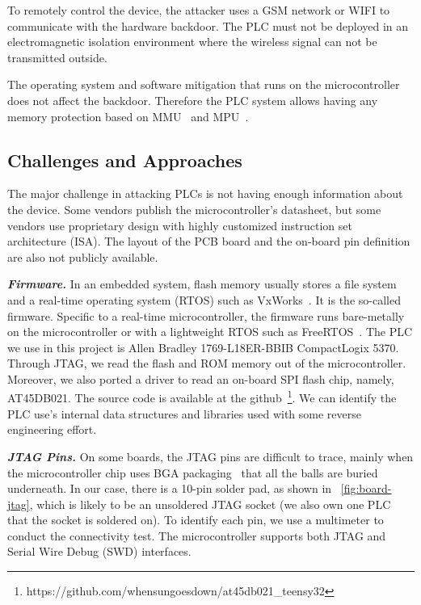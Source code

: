To remotely control the device, the attacker uses a GSM network or WIFI to communicate with the hardware backdoor. The PLC must not be deployed in an electromagnetic isolation environment where the wireless signal can not be transmitted outside.

The operating system and software mitigation that runs on the microcontroller does not affect the backdoor. Therefore the PLC system allows having any memory protection based on MMU~\cite{shalan2000dynamic} and MPU~\cite{kim2018securing}.


\subsection{Challenges and Approaches}

The major challenge in attacking PLCs is not having enough information about the device. Some vendors publish the microcontroller's datasheet, but some vendors use proprietary design with highly customized instruction set architecture (ISA).  The layout of the PCB board and the on-board pin definition are also not publicly available.


\textbf{\textit{Firmware.}} In an embedded system, flash memory usually stores a file system and a real-time operating system (RTOS) such as VxWorks~\cite{neugass1991vxworks}. It is the so-called firmware. Specific to a real-time microcontroller, the firmware runs bare-metally on the microcontroller or with a lightweight RTOS such as FreeRTOS~\cite{barry2008freertos}. The PLC we use in this project is Allen Bradley 1769-L18ER-BBIB CompactLogix 5370. Through JTAG, we read the flash and ROM memory out of the microcontroller.
Moreover, we also ported a driver to read an on-board SPI flash chip, namely, AT45DB021. The source code is available at the github~\footnote{https://github.com/whensungoesdown/at45db021\_teensy32}.  We can identify the PLC use's internal data structures and libraries used with some reverse engineering effort.


\textbf{\textit{JTAG Pins.}} On some boards, the JTAG pins are difficult to trace, mainly when the microcontroller chip uses BGA packaging~\cite{joshi2000mosfet} that all the balls are buried underneath. In our case, there is a 10-pin solder pad, as shown in ~\autoref{fig:board-jtag}, which is likely to be an unsoldered JTAG socket (we also own one PLC that the socket is soldered on).  To identify each pin, we use a multimeter to conduct the connectivity test. The microcontroller supports both JTAG and Serial Wire Debug (SWD)\cite{ashfieldserial} interfaces.


